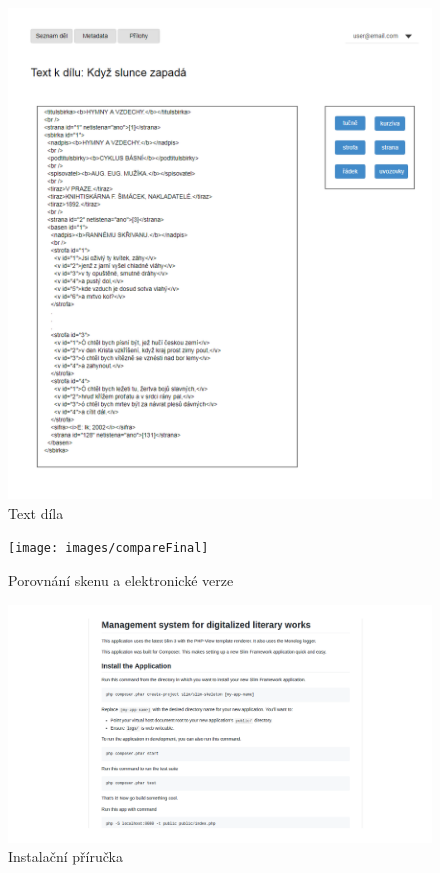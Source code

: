 \documentclass[thesis=B,czech]{FITthesis}[2012/06/26]
\begin{document}
    \begin {figure}[H]\centering
        \includegraphics[width=\textwidth]{images/text}
        \caption {Text díla}
        \label {fig:text}
    \end{figure}
    
    \begin {figure}[H]\centering
        \texttt{[image: images/compareFinal]}
        \caption {Porovnání skenu a elektronické verze}
        \label {fig:scan}
    \end{figure}
    
    \begin {figure}[H]\centering
        \includegraphics[width=1.2\textwidth]{images/install}
        \caption {Instalační příručka}
        \label {fig:install}
    \end{figure}
\end{document}
